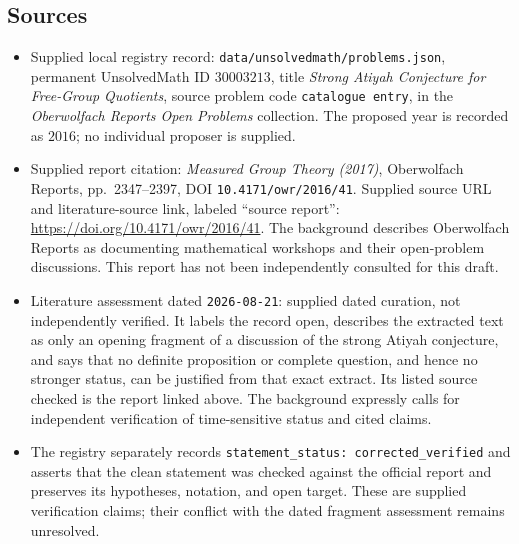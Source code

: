 \documentclass[11pt]{article}
\begin{document}
\subsection{Sources}
\begin{itemize}
\item Supplied local registry record: \texttt{data/unsolvedmath/problems.json}, permanent UnsolvedMath ID \(30003213\), title \emph{Strong Atiyah Conjecture for Free-Group Quotients}, source problem code \texttt{catalogue entry}, in the \emph{Oberwolfach Reports Open Problems} collection. The proposed year is recorded as \(2016\); no individual proposer is supplied.
\item Supplied report citation: \emph{Measured Group Theory (2017)}, Oberwolfach Reports, pp.\ 2347--2397, DOI \texttt{10.4171/owr/2016/41}. Supplied source URL and literature-source link, labeled ``source report'': \url{https://doi.org/10.4171/owr/2016/41}. The background describes Oberwolfach Reports as documenting mathematical workshops and their open-problem discussions. This report has not been independently consulted for this draft.
\item Literature assessment dated \texttt{2026-08-21}: supplied dated curation, not independently verified. It labels the record open, describes the extracted text as only an opening fragment of a discussion of the strong Atiyah conjecture, and says that no definite proposition or complete question, and hence no stronger status, can be justified from that exact extract. Its listed source checked is the report linked above. The background expressly calls for independent verification of time-sensitive status and cited claims.
\item The registry separately records \texttt{statement\_status: corrected\_verified} and asserts that the clean statement was checked against the official report and preserves its hypotheses, notation, and open target. These are supplied verification claims; their conflict with the dated fragment assessment remains unresolved.
\end{itemize}
\end{document}
